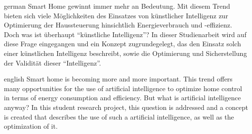 \documentclass[
ngerman, %
a4paper, %
12pt,
pdftex,
disable %
]{report}
\begin{document}
\begin{abstractpage}
  \begin{myabstract}{german}
    Smart Home gewinnt immer mehr an Bedeutung. Mit diesem Trend bieten sich viele Möglichkeiten des Einsatzes von künstlicher Intelligenz zur Optimierung der Haussteuerung hinsichtlich Energieverbrauch und -effizienz. Doch was ist überhaupt \enquote{künstliche Intelligenz}? In dieser Studienarbeit wird auf diese Frage eingegangen und ein Konzept zugrundegelegt, das den Einsatz solch einer künstlichen Intelligenz beschreibt, sowie die Optimierung und Sicherstellung der Validität dieser \enquote{Intelligenz}.
  \end{myabstract}

  \begin{myabstract}{english}
    Smart home is becoming more and more important. This trend offers many opportunities for the use of artificial intelligence to optimize home control in terms of energy consumption and efficiency. But what is artificial intelligence anyway? In this student research project, this question is addressed and a concept is created that describes the use of such a artificial intelligence, as well as the optimization of it.
  \end{myabstract}
\end{abstractpage}

\tableofcontents
\listoffigures
\lstlistoflistings

\printnoidxglossary[type=\acronymtype, title={Abkürzungsverzeichnis}]
\clearpage








\appendix

\def\refname{Literaturverzeichnis}
\printbibliography

\newpage
\listoftodos
\end{document}
